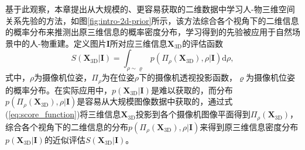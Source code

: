 基于此观察，本章提出从大规模的、更容易获取的二维数据中学习人-物三维空间关系先验的方法，如图\ref{fig:intro-2d-prior}所示，该方法综合各个视角下的二维信息的概率分布来推测出原三维信息的概率密度分布，学习得到的先验被应用于自然场景中的人-物重建。定义图片$\mathbf{I}$所对应三维信息$\mathbf{X}_{\text{3D}}$的评估函数
\begin{equation}\label{eq:score_function}
	S(\mathbf{X}_{\text{3D}}|\mathbf{I}) = \int_{\rho \sim \varrho} p(\Pi_{\rho}(\mathbf{X}_{\text{3D}}), \rho|\mathbf{I}) \text{d}{\rho},
\end{equation}
式中，$\rho$为摄像机位姿，$\Pi_{\rho}$为在位姿$\rho$下的摄像机透视投影函数，$\varrho$为摄像机位姿的概率分布。在实际应用中，$p(\mathbf{X}_{\text{3D}}|\mathbf{I})$是难以获取的，而分布$p(\Pi_\rho(\mathbf{X}_{\text{3D}}), \rho| \mathbf{I})$是容易从大规模图像数据中获取的，通过式(\ref{eq:score_function})将三维信息$\mathbf{X}_{\text{3D}}$投影到各个摄像机图像平面得到$\Pi_\rho(\mathbf{X}_{\text{3D}})$，综合各个视角下的二维信息的分布$p(\Pi_\rho(\mathbf{X}_{\text{3D}}), \rho| \mathbf{I})$来得到原三维信息密度分布$p(\mathbf{X}_{\text{3D}}|\mathbf{I})$的近似评估$S(\mathbf{X}_{\text{3D}}|\mathbf{I})$。

